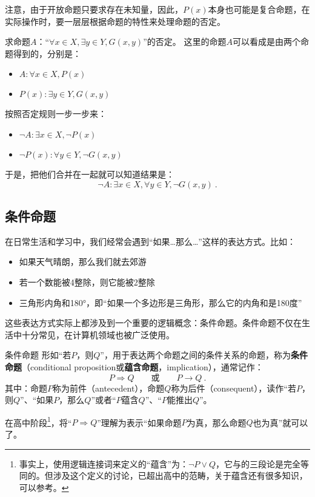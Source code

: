 注意，由于开放命题只要求存在未知量，因此，$P(x)$本身也可能是复合命题，在实际操作时，要一层层根据命题的特性来处理命题的否定。
\begin{exercise}{求命题$A$：“$\forall x\in X,\exists y\in Y,G(x,y)$”的否定。}
这里的命题$A$可以看成是由两个命题得到的，分别是：
\begin{itemize}
\item $A:\forall x\in X,P(x)$
\item $P(x):\exists y\in Y,G(x,y)$
\end{itemize}
按照否定规则一步一步来：
\begin{itemize}
\item $\lnot A:\exists x\in X,\lnot P(x)$
\item $\lnot P(x):\forall y\in Y,\lnot G(x,y)$
\end{itemize}
于是，把他们合并在一起就可以知道结果是：
$$
\lnot A:\exists x\in X,\forall y\in Y,\lnot G(x,y)~.
$$
\end{exercise}

\subsection{条件命题}\label{sub_HsCoPr_1}

在日常生活和学习中，我们经常会遇到“如果…那么…”这样的表达方式。比如：
\begin{itemize}
\item 如果天气晴朗，那么我们就去郊游
\item 若一个数能被4整除，则它能被2整除
\item 三角形内角和180°，即“如果一个多边形是三角形，那么它的内角和是180度”
\end{itemize}
这些表达方式实际上都涉及到一个重要的逻辑概念：条件命题。条件命题不仅在生活中十分常见，在计算机领域也被广泛使用。

\begin{definition}{条件命题}
形如“若$P$，则$Q$”，用于表达两个命题之间的条件关系的命题，称为\textbf{条件命题}（conditional proposition或\textbf{蕴含命题}，implication），通常记作：
\begin{equation}
P\Rightarrow Q\qquad\text{或}\qquad P\rightarrow Q~.
\end{equation}
其中：命题$P$称为前件（antecedent），命题$Q$称为后件（consequent），读作“若$P$，则$Q$”、“如果$P$，那么$Q$”或者“$P$蕴含$Q$”、“$P$能推出$Q$”。
\end{definition}

在高中阶段\footnote{事实上，使用逻辑连接词来定义的“蕴含”为：$\lnot P\lor Q$，它与的三段论是完全等同的。但涉及这个定义的讨论，已超出高中的范畴，关于蕴含还有很多知识，可以参考。}，将“$P\Rightarrow Q$”理解为表示“如果命题$P$为真，那么命题$Q$也为真”就可以了。

